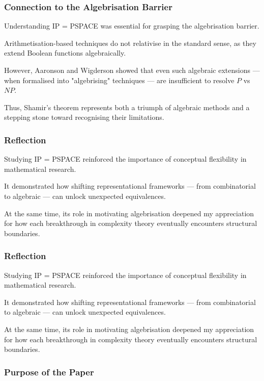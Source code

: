 \documentclass[12pt]{article}
\begin{document}
\subsubsection*{Connection to the Algebrisation Barrier}

Understanding IP = PSPACE was essential for grasping the algebrisation barrier.

Arithmetisation-based techniques do not relativise in the standard sense, as they extend Boolean functions algebraically.

However, Aaronson and Wigderson showed that even such algebraic extensions --- when formalised into "algebrising" techniques --- are insufficient to resolve $P$ vs $NP$.

Thus, Shamir's theorem represents both a triumph of algebraic methods and a stepping stone toward recognising their limitations.

\subsubsection*{Reflection}

Studying IP = PSPACE reinforced the importance of conceptual flexibility in mathematical research.

It demonstrated how shifting representational frameworks --- from combinatorial to algebraic --- can unlock unexpected equivalences.

At the same time, its role in motivating algebrisation deepened my appreciation for how each breakthrough in complexity theory eventually encounters structural boundaries.

\subsubsection*{Reflection}

Studying IP = PSPACE reinforced the importance of conceptual flexibility in mathematical research.

It demonstrated how shifting representational frameworks --- from combinatorial to algebraic --- can unlock unexpected equivalences.

At the same time, its role in motivating algebrisation deepened my appreciation for how each breakthrough in complexity theory eventually encounters structural boundaries.

\subsubsection*{Purpose of the Paper}
\end{document}

